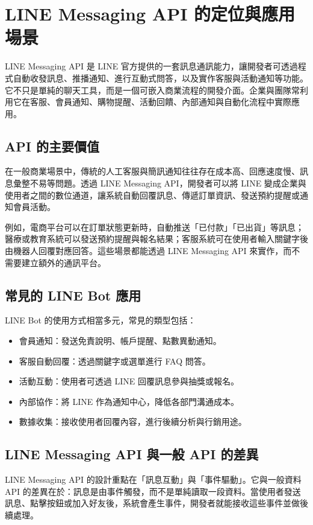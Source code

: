 \section{LINE Messaging API 的定位與應用場景}

LINE Messaging API 是 LINE 官方提供的一套訊息通訊能力，讓開發者可透過程式自動收發訊息、推播通知、進行互動式問答，以及實作客服與活動通知等功能。它不只是單純的聊天工具，而是一個可嵌入商業流程的開發介面。企業與團隊常利用它在客服、會員通知、購物提醒、活動回饋、內部通知與自動化流程中實際應用。

\subsection{API 的主要價值}

在一般商業場景中，傳統的人工客服與簡訊通知往往存在成本高、回應速度慢、訊息彙整不易等問題。透過 LINE Messaging API，開發者可以將 LINE 變成企業與使用者之間的數位通道，讓系統自動回覆訊息、傳遞訂單資訊、發送預約提醒或通知會員活動。

例如，電商平台可以在訂單狀態更新時，自動推送「已付款」「已出貨」等訊息；醫療或教育系統可以發送預約提醒與報名結果；客服系統可在使用者輸入關鍵字後由機器人回覆對應回答。這些場景都能透過 LINE Messaging API 來實作，而不需要建立額外的通訊平台。

\subsection{常見的 LINE Bot 應用}

LINE Bot 的使用方式相當多元，常見的類型包括：
\begin{itemize}[leftmargin=2em]
    \item 會員通知：發送免責說明、帳戶提醒、點數異動通知。
    \item 客服自動回覆：透過關鍵字或選單進行 FAQ 問答。
    \item 活動互動：使用者可透過 LINE 回覆訊息參與抽獎或報名。
    \item 內部協作：將 LINE 作為通知中心，降低各部門溝通成本。
    \item 數據收集：接收使用者回覆內容，進行後續分析與行銷用途。
\end{itemize}

\subsection{LINE Messaging API 與一般 API 的差異}

LINE Messaging API 的設計重點在「訊息互動」與「事件驅動」。它與一般資料 API 的差異在於：訊息是由事件觸發，而不是單純讀取一段資料。當使用者發送訊息、點擊按鈕或加入好友後，系統會產生事件，開發者就能接收這些事件並做後續處理。

